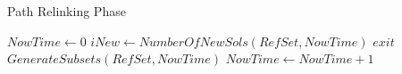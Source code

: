 \begin{algorithm}
  \caption{Path Relinking Phase}\label{pr_phase}
  \begin{algorithmic}[0]
    \State $NowTime \gets 0$
    \State $iNew \gets NumberOfNewSols(RefSet,NowTime)$
    \State $exit$
    \EndIf
    \State $GenerateSubsets(RefSet,NowTime)$
    \State $NowTime \gets NowTime + 1$
    \EndWhile
    \EndProcedure
  \end{algorithmic}
\end{algorithm}
